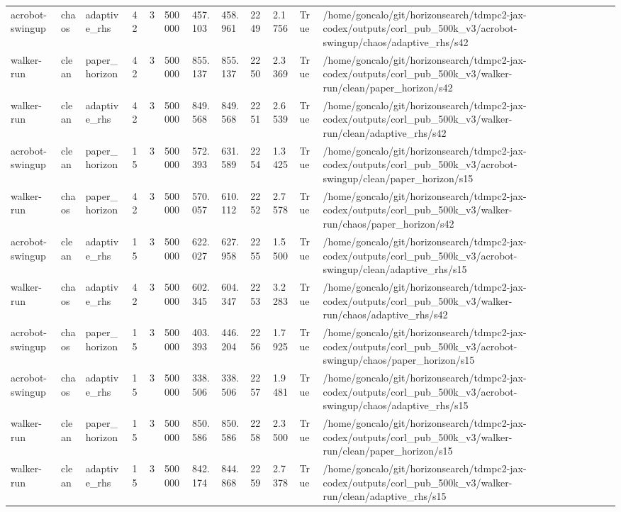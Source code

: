 \begin{tabular}{llllllllllll}
acrobot-swingup & chaos & adaptive\_rhs & 42 & 3 & 500000 & 457.103 & 458.961 & 2249 & 2.1756 & True & /home/goncalo/git/horizonsearch/tdmpc2-jax-codex/outputs/corl\_pub\_500k\_v3/acrobot-swingup/chaos/adaptive\_rhs/s42 \\
walker-run & clean & paper\_horizon & 42 & 3 & 500000 & 855.137 & 855.137 & 2250 & 2.3369 & True & /home/goncalo/git/horizonsearch/tdmpc2-jax-codex/outputs/corl\_pub\_500k\_v3/walker-run/clean/paper\_horizon/s42 \\
walker-run & clean & adaptive\_rhs & 42 & 3 & 500000 & 849.568 & 849.568 & 2251 & 2.6539 & True & /home/goncalo/git/horizonsearch/tdmpc2-jax-codex/outputs/corl\_pub\_500k\_v3/walker-run/clean/adaptive\_rhs/s42 \\
acrobot-swingup & clean & paper\_horizon & 15 & 3 & 500000 & 572.393 & 631.589 & 2254 & 1.3425 & True & /home/goncalo/git/horizonsearch/tdmpc2-jax-codex/outputs/corl\_pub\_500k\_v3/acrobot-swingup/clean/paper\_horizon/s15 \\
walker-run & chaos & paper\_horizon & 42 & 3 & 500000 & 570.057 & 610.112 & 2252 & 2.7578 & True & /home/goncalo/git/horizonsearch/tdmpc2-jax-codex/outputs/corl\_pub\_500k\_v3/walker-run/chaos/paper\_horizon/s42 \\
acrobot-swingup & clean & adaptive\_rhs & 15 & 3 & 500000 & 622.027 & 627.958 & 2255 & 1.5500 & True & /home/goncalo/git/horizonsearch/tdmpc2-jax-codex/outputs/corl\_pub\_500k\_v3/acrobot-swingup/clean/adaptive\_rhs/s15 \\
walker-run & chaos & adaptive\_rhs & 42 & 3 & 500000 & 602.345 & 604.347 & 2253 & 3.2283 & True & /home/goncalo/git/horizonsearch/tdmpc2-jax-codex/outputs/corl\_pub\_500k\_v3/walker-run/chaos/adaptive\_rhs/s42 \\
acrobot-swingup & chaos & paper\_horizon & 15 & 3 & 500000 & 403.393 & 446.204 & 2256 & 1.7925 & True & /home/goncalo/git/horizonsearch/tdmpc2-jax-codex/outputs/corl\_pub\_500k\_v3/acrobot-swingup/chaos/paper\_horizon/s15 \\
acrobot-swingup & chaos & adaptive\_rhs & 15 & 3 & 500000 & 338.506 & 338.506 & 2257 & 1.9481 & True & /home/goncalo/git/horizonsearch/tdmpc2-jax-codex/outputs/corl\_pub\_500k\_v3/acrobot-swingup/chaos/adaptive\_rhs/s15 \\
walker-run & clean & paper\_horizon & 15 & 3 & 500000 & 850.586 & 850.586 & 2258 & 2.3500 & True & /home/goncalo/git/horizonsearch/tdmpc2-jax-codex/outputs/corl\_pub\_500k\_v3/walker-run/clean/paper\_horizon/s15 \\
walker-run & clean & adaptive\_rhs & 15 & 3 & 500000 & 842.174 & 844.868 & 2259 & 2.7378 & True & /home/goncalo/git/horizonsearch/tdmpc2-jax-codex/outputs/corl\_pub\_500k\_v3/walker-run/clean/adaptive\_rhs/s15 \\

\end{tabular}
